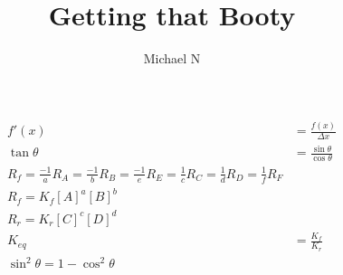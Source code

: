 \documentclass{article}
\begin{document}
\title{Getting that Booty}
\author{Michael N}

\maketitle
\begin{center}
\begin{align}
  f'(x)&=\frac{f(x)}{\Delta x}\\
  \tan \theta &= \frac{\sin \theta}{\cos \theta}\\
  R_{f}=\frac{-1}{a} R_{A} = \frac{-1}{b} R_{B} = \frac{-1}{e} R_{E} = \frac{1}{c} R_{C} = \frac{1}{d} R_{D} = \frac{1}{f} R_{F}\\
  R_{f} = K_{f}[A]^a[B]^b\\
  R_{r} = K_{r}[C]^c[D]^d\\
  K_{eq} &= \frac{K_f}{K_r}\\
  \sin^2 \theta = 1 - \cos^2 \theta\\
\end{align}
\end{center}
\end{document}
